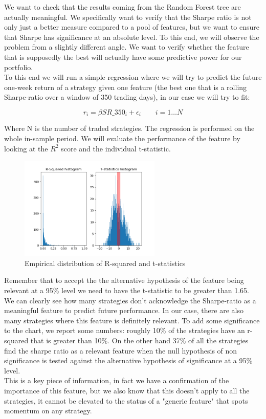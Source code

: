 We want to check that the results coming from the Random Forest tree are actually meaningful. We specifically want to verify that the Sharpe ratio is not only just a better measure compared to a pool of features, but we want to ensure that Sharpe has significance at an absolute level. To this end, we will observe the problem from a slightly different angle. We want to verify whether the feature that is supposedly the best will actually have some predictive power for our portfolio.\\
To this end we will run a simple regression where we will try to predict the future one-week return of a strategy given one feature (the best one that is a rolling Sharpe-ratio over a window of 350 trading days), in our case we will try to fit:

\begin{equation} \label{regression}
r_i = \beta SR\_350_i + \epsilon_i \qquad i=1\dots N
\end{equation}

Where N is the number of traded strategies. The regression is performed on the whole in-sample period. We will evaluate the performance of the feature by looking at the $R^2$ score and the individual t-statistic.

\begin{figure}[htbp]
	\centering
	\includegraphics[width=0.6\textwidth]{Part_1/histograms.png}
	\caption{Empirical distribution of R-squared and t-statistics}
	\label{histograms}
\end{figure}

Remember that to accept the the alternative hypothesis of the feature being relevant at a 95\% level we need to have the t-statistic to be greater than 1.65.\\
We can clearly see how many strategies don't acknowledge the Sharpe-ratio as a meaningful feature to predict future performance. In our case, there are also many strategies where this feature is definitely relevant. To add some significance to the chart, we report some numbers: 
roughly 10\% of the strategies have an r-squared that is greater than 10\%. On the other hand 37\% of all the strategies find the sharpe ratio as a relevant feature when the null hypothesis of non significance is tested against the alternative hypothesis of significance at a 95\% level.\\
This is a key piece of information, in fact we have a confirmation of the importance of this feature, but we also know that this doesn't apply to all the strategies, it cannot be elevated to the status of a "generic feature" that spots momentum on any strategy. 